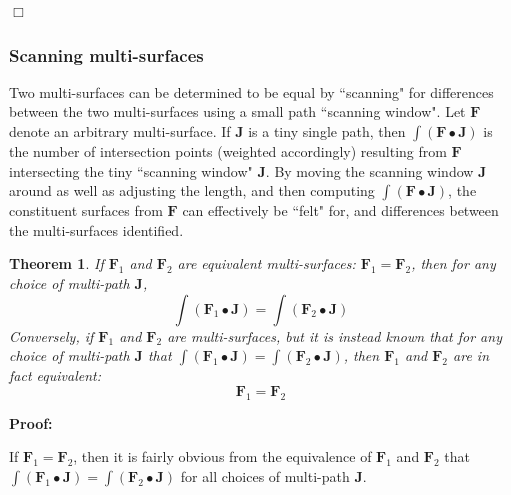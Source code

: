 \documentclass{book}
\newtheorem{thm}{Theorem}
\begin{document}
\(\Box\)

\subsubsection{Scanning multi-surfaces}

Two multi-surfaces can be determined to be equal by ``scanning" for differences between the two multi-surfaces using a small path ``scanning window". Let \(\mathbf{F}\) denote an arbitrary multi-surface. If \(\mathbf{J}\) is a tiny single path, then \(\int (\mathbf{F} \bullet \mathbf{J})\) is the number of intersection points (weighted accordingly) resulting from \(\mathbf{F}\) intersecting the tiny ``scanning window" \(\mathbf{J}\). By moving the scanning window \(\mathbf{J}\) around as well as adjusting the length, and then computing \(\int (\mathbf{F} \bullet \mathbf{J})\), the constituent surfaces from \(\mathbf{F}\) can effectively be ``felt" for, and differences between the multi-surfaces identified.  

\begin{thm}
If \(\mathbf{F}_1\) and \(\mathbf{F}_2\) are equivalent multi-surfaces: \(\mathbf{F}_1 = \mathbf{F}_2\), then for any choice of multi-path \(\mathbf{J}\), 
\[\int (\mathbf{F}_1 \bullet \mathbf{J}) = \int (\mathbf{F}_2 \bullet \mathbf{J})\]
Conversely, if \(\mathbf{F}_1\) and \(\mathbf{F}_2\) are multi-surfaces, but it is instead known that for any choice of multi-path \(\mathbf{J}\) that 
\(\int (\mathbf{F}_1 \bullet \mathbf{J}) = \int (\mathbf{F}_2 \bullet \mathbf{J})\), then \(\mathbf{F}_1\) and \(\mathbf{F}_2\) are in fact equivalent:
\[\mathbf{F}_1 = \mathbf{F}_2\]  
\end{thm}
\textbf{Proof:}

If \(\mathbf{F}_1 = \mathbf{F}_2\), then it is fairly obvious from the equivalence of \(\mathbf{F}_1\) and \(\mathbf{F}_2\) that \(\int (\mathbf{F}_1 \bullet \mathbf{J}) = \int (\mathbf{F}_2  \bullet \mathbf{J})\) for all choices of multi-path \(\mathbf{J}\). 

\vspace{5mm}
\end{document}
